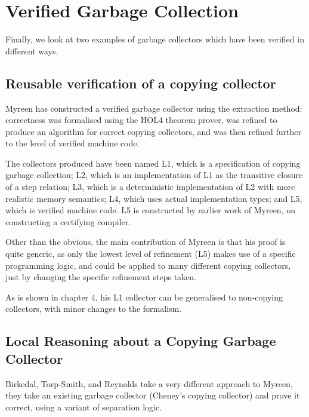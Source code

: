 \section{Verified Garbage Collection}
\label{sec:lit-verifiedgc}

Finally, we look at two examples of \glspl{garbage collector} which
have been verified in different ways.

\subsection{Reusable verification of a copying collector}
\label{sec:lit-verifiedgc-myreen}

Myreen\cite{Myreen10} has constructed a verified \gls{garbage
  collector} using the extraction method: correctness was formalised
using the HOL4 theorem prover, was refined to produce an algorithm for
correct \gls{copying} \glspl{collector}, and was then refined further
to the level of verified machine code.

The \glspl{collector} produced have been named L1, which is a
specification of copying \gls{garbage collection}; L2, which is an
implementation of L1 as the transitive closure of a step relation; L3,
which is a deterministic implementation of L2 with more realistic
memory semantics; L4, which uses actual implementation types; and L5,
which is verified machine code. L5 is constructed by earlier work of
Myreen, on constructing a certifying compiler.

Other than the obvious, the main contribution of Myreen is that his
proof is quite generic, as only the lowest level of refinement (L5)
makes use of a specific programming logic, and could be applied to many
different copying collectors, just by changing the specific refinement
steps taken.

As is shown in chapter 4, his L1 collector can be generalised to
non-copying collectors, with minor changes to the formalism.

\subsection{Local Reasoning about a Copying Garbage Collector}
\label{sec:lit-verifiedgc-birkedal}

Birkedal, Torp-Smith, and Reynolds\cite{Birkedal04} take a very
different approach to Myreen, they take an existing \gls{garbage
  collector} (Cheney's copying collector) and prove it correct, using
a variant of separation logic.

